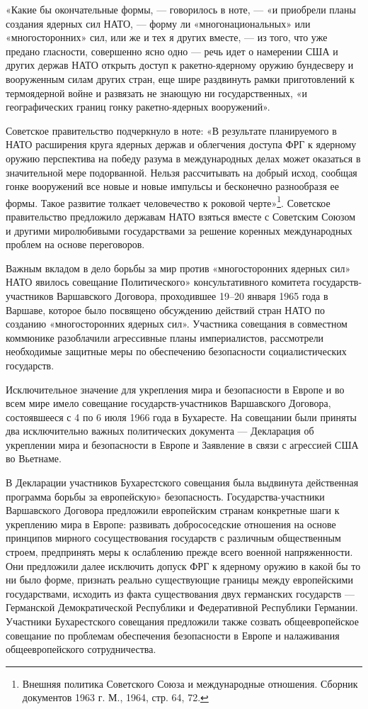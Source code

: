 \documentclass[12pt, a4paper, openany]{book}
\begin{document}
	«Какие бы окончательные формы, — говорилось в ноте, — «и приобрели планы создания ядерных сил НАТО, — форму ли «многонациональных» или «многосторонних» сил, или же и тех я других вместе, — из того, что уже предано гласности, совершенно ясно одно — речь идет о намерении США и других держав НАТО открыть доступ к ракетно-ядерному оружию бундесверу и вооруженным силам других стран, еще шире раздвинуть рамки приготовлений к термоядерной войне и развязать не знающую ни государственных, «и географических границ гонку ракетно-ядерных вооружений».
	
	Советское правительство подчеркнуло в ноте: «В результате планируемого в НАТО расширения круга ядерных держав и облегчения доступа ФРГ к ядерному оружию перспектива на победу разума в международных делах может оказаться в значительной мере подорванной. Нельзя рассчитывать на добрый исход, сообщая гонке вооружений все новые и новые импульсы и бесконечно разнообразя ее формы. Такое развитие толкает человечество к роковой черте»{\footnote{Внешняя политика Советского Союза и международные отношения. Сборник документов 1963 г. М., 1964, стр. 64, 72.}}. Советское правительство предложило державам НАТО взяться вместе с Советским Союзом и другими миролюбивыми государствами за решение коренных международных проблем на основе переговоров.
	
	Важным вкладом в дело борьбы за мир против «многосторонних ядерных сил» НАТО явилось совещание Политического» консультативного комитета государств-участников Варшавского Договора, проходившее 19–20 января 1965 года в Варшаве, которое было посвящено обсуждению действий стран НАТО по созданию «многосторонних ядерных сил». Участника совещания в совместном коммюнике разоблачили агрессивные планы империалистов, рассмотрели необходимые защитные меры по обеспечению безопасности социалистических государств.
	
	Исключительное значение для укрепления мира и безопасности в Европе и во всем мире имело совещание государств-участников Варшавского Договора, состоявшееся с 4 по 6 июля 1966 года в Бухаресте. На совещании были приняты два исключительно важных политических документа — Декларация об укреплении мира и безопасности в Европе и Заявление в связи с агрессией США во Вьетнаме.
	
	В Декларации участников Бухарестского совещания была выдвинута действенная программа борьбы за европейскую» безопасность. Государства-участники Варшавского Договора предложили европейским странам конкретные шаги к укреплению мира в Европе: развивать добрососедские отношения на основе принципов мирного сосуществования государств с различным общественным строем, предпринять меры к ослаблению прежде всего военной напряженности. Они предложили далее исключить допуск ФРГ к ядерному оружию в какой бы то ни было форме, признать реально существующие границы между европейскими государствами, исходить из факта существования двух германских государств — Германской Демократической Республики и Федеративной Республики Германии. Участники Бухарестского совещания предложили также созвать общеевропейское совещание по проблемам обеспечения безопасности в Европе и налаживания общеевропейского сотрудничества.
	
\end{document}
